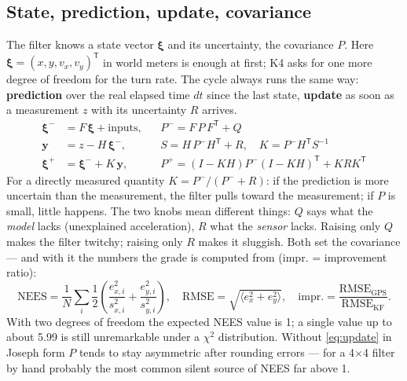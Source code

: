 \documentclass[12pt,a4paper]{scrartcl}
\begin{document}
\subsection{State, prediction, update, covariance}
The filter knows a state vector \(\boldsymbol\xi\) and its uncertainty, the covariance
\(P\). Here \(\boldsymbol\xi=(x,y,v_x,v_y)^{\mathsf T}\) in world meters is enough at
first; K4 asks for one more degree of freedom for the turn rate. The cycle always runs
the same way: \textbf{prediction} over the real elapsed time \(dt\) since the last state,
\textbf{update} as soon as a measurement \(z\) with its uncertainty \(R\) arrives.
\begin{align}
  \boldsymbol\xi^{-} &= F\,\boldsymbol\xi + \text{inputs},
   && P^{-} = F\,P\,F^{\mathsf T} + Q
   \label{eq:pradiktion}\\
  \mathbf y &= z - H\,\boldsymbol\xi^{-},
   && S = H\,P^{-}H^{\mathsf T} + R,\quad K = P^{-}H^{\mathsf T}S^{-1}
   \label{eq:innovation}\\
  \boldsymbol\xi^{+} &= \boldsymbol\xi^{-} + K\,\mathbf y,
   && P^{+} = (I-KH)P^{-}(I-KH)^{\mathsf T} + KRK^{\mathsf T}
   \label{eq:update}
\end{align}
For a directly measured quantity \(K = P^{-}/(P^{-}+R)\): if the prediction is more
uncertain than the measurement, the filter pulls toward the measurement; if \(P\) is
small, little happens. The two knobs mean different things: \(Q\) says what the
\emph{model} lacks (unexplained acceleration), \(R\) what the \emph{sensor} lacks. Raising
only \(Q\) makes the filter twitchy; raising only \(R\) makes it sluggish. Both set the
covariance — and with it the numbers the grade is computed from (impr. = improvement ratio):
\begin{equation}
  \mathrm{NEES} = \frac1N\sum_i \frac12\!
     \left(\frac{e_{x,i}^{2}}{s_{x,i}^{2}} + \frac{e_{y,i}^{2}}{s_{y,i}^{2}}\right),\quad
  \mathrm{RMSE} = \sqrt{\langle e_x^2+e_y^2\rangle},\quad
  \text{impr.} = \frac{\mathrm{RMSE}_{\text{GPS}}}{\mathrm{RMSE}_{\text{KF}}}.
  \label{eq:nees}
\end{equation}
With two degrees of freedom the expected NEES value is 1; a single value up to about 5.99
is still unremarkable under a \(\chi^2\) distribution. Without \cref{eq:update} in Joseph
form \(P\) tends to stay asymmetric after rounding errors — for a 4×4 filter by hand
probably the most common silent source of NEES far above 1.
\end{document}
